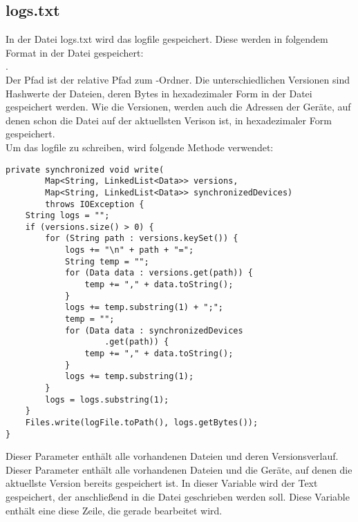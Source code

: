 \subsection{logs.txt}
In der Datei logs.txt wird das \gls{logfile}  gespeichert. Diese werden in folgendem Format in der Datei gespeichert: \\ . \\
Der Pfad ist der relative Pfad zum \sblit-Ordner. Die unterschiedlichen Versionen sind Hashwerte der Dateien, deren Bytes in hexadezimaler Form in der Datei gespeichert werden. Wie die Versionen, werden auch die Adressen der Geräte, auf denen schon die Datei auf der aktuellsten Verison ist, in hexadezimaler Form gespeichert. \\
Um das \gls{logfile} zu schreiben, wird folgende Methode verwendet: \\
\javalisting
\begin{minipage}{\linewidth}
\begin{lstlisting}[caption={Schreiben des Logfiles},captionpos=b]
private synchronized void write(
		Map<String, LinkedList<Data>> versions,
		Map<String, LinkedList<Data>> synchronizedDevices)
		throws IOException {
	String logs = "";
	if (versions.size() > 0) {
		for (String path : versions.keySet()) {
			logs += "\n" + path + "=";
			String temp = "";
			for (Data data : versions.get(path)) {
				temp += "," + data.toString();
			}
			logs += temp.substring(1) + ";";
			temp = "";
			for (Data data : synchronizedDevices
					.get(path)) {
				temp += "," + data.toString();
			}
			logs += temp.substring(1);
		}
		logs = logs.substring(1);
	}
	Files.write(logFile.toPath(), logs.getBytes());
}
\end{lstlisting}
\end{minipage}
\begin{description}
	Dieser Parameter enthält alle vorhandenen Dateien und deren Versionsverlauf.
	Dieser Parameter enthält alle vorhandenen Dateien und die Geräte, auf denen die aktuellste Version bereits gespeichert ist.
	In dieser Variable wird der Text gespeichert, der anschließend in die Datei geschrieben werden soll.
	Diese Variable enthält eine diese Zeile, die gerade bearbeitet wird.
\end{description}
